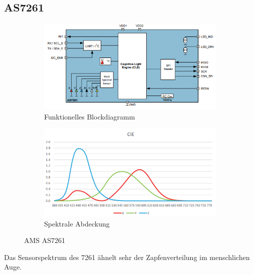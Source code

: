 \documentclass[11pt]{scrartcl}
\begin{document}
\subsection{AS7261}
\begin{figure}[H]
    \centering
    \begin{subfigure}[b]{0.49\textwidth}
        \includegraphics[width=\textwidth]{images/AS7261_functional_blockdiagram.png}
        \caption{Funktionelles Blockdiagramm}
    \end{subfigure}
    \hfill 
    \begin{subfigure}[b]{0.49\textwidth}
        \includegraphics[width=\textwidth]{images/AS7261_spectrum.png}
        \caption{Spektrale Abdeckung}
    \end{subfigure}
    \caption{AMS AS7261 \cite{datasheet61}}\label{fig:AS7261}
\end{figure}
\noindent
Das Sensorspektrum des 7261 ähnelt sehr der Zapfenverteilung im menschlichen Auge.
\clearpage
\end{document}
